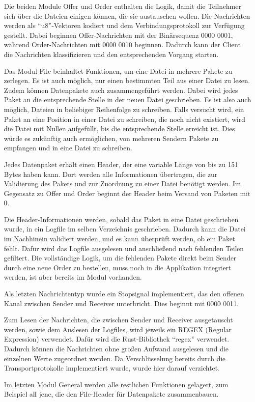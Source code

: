 Die beiden Module Offer und Order enthalten die Logik, damit die Teilnehmer sich über die Dateien einigen können, die sie austauschen wollen.
Die Nachrichten werden als \enquote{u8}-Vektoren kodiert und dem Verbindungsprotokoll zur Verfügung gestellt. Dabei beginnen Offer-Nachrichten mit der Binärsequenz 0000 0001, während Order-Nachrichten mit 0000 0010 beginnen.
Dadurch kann der Client die Nachrichten klassifizieren und den entsprechenden Vorgang starten.

Das Modul File beinhaltet Funktionen, um eine Datei in mehrere Pakete zu zerlegen. Es ist auch möglich, nur einen bestimmten Teil aus einer Datei zu lesen.
Zudem können Datenpakete auch zusammengeführt werden. Dabei wird jedes Paket an die entsprechende Stelle in der neuen Datei geschrieben. Es ist also auch möglich, Dateien in beliebiger Reihenfolge zu schreiben. Falls versucht wird, ein Paket an eine Position in einer Datei zu schreiben, die noch nicht existiert, wird die Datei mit Nullen aufgefüllt, bis die entsprechende Stelle erreicht ist.
Dies würde es zukünftig auch ermöglichen, von mehreren Sendern Pakete zu empfangen und in eine Datei zu schreiben.

Jedes Datenpaket erhält einen Header, der eine variable Länge von bis zu 151 Bytes haben kann. Dort werden alle Informationen übertragen, die zur Validierung des Pakets und zur Zuordnung zu einer Datei benötigt werden.
Im Gegensatz zu Offer und Order beginnt der Header beim Versand von Paketen mit 0.

Die Header-Informationen werden, sobald das Paket in eine Datei geschrieben wurde, in ein Logfile im selben Verzeichnis geschrieben. Dadurch kann die Datei im Nachhinein validiert werden, und es kann überprüft werden, ob ein Paket fehlt. Dafür wird das Logfile ausgelesen und anschließend nach fehlenden Teilen gefiltert.
Die vollständige Logik, um die fehlenden Pakete direkt beim Sender durch eine neue Order zu bestellen, muss noch in die Applikation integriert werden, ist aber bereits im Modul vorhanden.

Als letzten Nachrichtentyp wurde ein Stopsignal implementiert, das den offenen Kanal zwischen Sender und Receiver unterbricht. Dies beginnt mit 0000 0011.

Zum Lesen der Nachrichten, die zwischen Sender und Receiver ausgetauscht werden, sowie dem Auslesen der Logfiles, wird jeweils ein REGEX (Regular Expression) verwendet. Dafür wird die Rust-Bibliothek \enquote{regex} verwendet.
Dadurch können die Nachrichten ohne großen Aufwand ausgelesen und die einzelnen Werte zugeordnet werden.
Da Verschlüsselung bereits durch die Transportprotokolle implementiert wurde, wurde hier darauf verzichtet.

Im letzten Modul General werden alle restlichen Funktionen gelagert, zum Beispiel all jene, die den File-Header für Datenpakete zusammenbauen.

